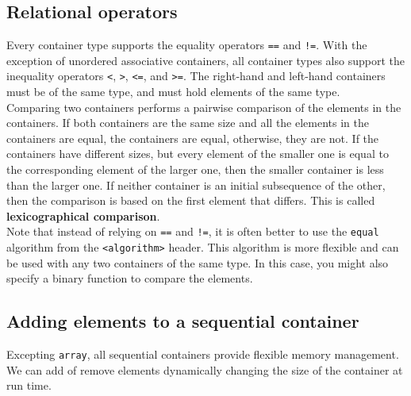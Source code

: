 \subsection{Relational operators}

Every container type supports the equality operators \texttt{==} and \texttt{!=}. With 
the exception of unordered associative containers, all container types also support the
inequality operators \texttt{<}, \texttt{>}, \texttt{<=}, and \texttt{>=}. The right-hand
and left-hand containers must be of the same type, and must hold elements of the same type.\\

Comparing two containers performs a pairwise comparison of the elements in the containers.
If both containers are the same size and all the elements in the containers are equal, the
containers are equal, otherwise, they are not. If the containers have different sizes, but
every element of the smaller one is equal to the corresponding element of the larger one,
then the smaller container is less than the larger one. If neither container is an initial
subsequence of the other, then the comparison is based on the first element that differs. 
This is called \textbf{lexicographical comparison}.\\

Note that instead of relying on \texttt{==} and \texttt{!=}, it is often better to use the
\texttt{equal} algorithm from the \texttt{<algorithm>} header. This algorithm is more flexible
and can be used with any two containers of the same type. In this case, you might also specify
a binary function to compare the elements.

\subsection{Adding elements to a sequential container}

Excepting \texttt{array}, all sequential containers provide flexible memory management. We can add
of remove elements dynamically changing the size of the container at run time.

